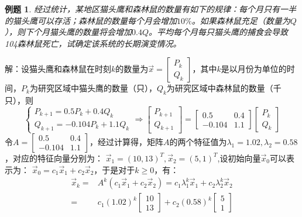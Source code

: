 \documentclass[a4paper]{book}
\newtheorem{eg}{例题}[chapter]
\begin{document}
\begin{eg}
经过统计，某地区猫头鹰和森林鼠的数量有如下的规律：每个月只有一半的猫头鹰可以存活；森林鼠的数量每个月会增加$10\%$。如果森林鼠充足（数量为$Q$），则下个月猫头鹰的数量将会增加$0.4Q$。平均每个月每只猫头鹰的捕食会导致104森林鼠死亡，试确定该系统的长期演变情况。
\end{eg}
解：设猫头鹰和森林鼠在时刻$k$的数量为$\vec{x}=\begin{bmatrix}P_k\\Q_k\end{bmatrix}$，其中$k$是以月份为单位的时间，$P_k$为研究区域中猫头鹰的数量（只），$Q_k$为研究区域中森林鼠的数量（千只），则
\begin{equation*}
\begin{cases}
P_{k+1}=0.5P_{k}+0.4Q_k\\
Q_{k+1}=-0.104P_k+1.1Q_k
\end{cases}
\Rightarrow
\begin{bmatrix}P_{k+1}\\Q_{k+1}\end{bmatrix}=
\begin{bmatrix}0.5&0.4\\-0.104&1.1\end{bmatrix}
\begin{bmatrix}P_k\\Q_k\end{bmatrix}
\end{equation*}
令$A=\begin{bmatrix}0.5&0.4\\-0.104&1.1\end{bmatrix}$，经过计算得，矩阵$A$的两个特征值为$\lambda_1=1.02,\lambda_2=0.58$，对应的特征向量分别为：
$\vec{x}_1=(10,13)^T,\vec{x}_2=(5,1)^T$,设初始向量$\vec{x}_0$可以表示为：
$\vec{x}_0=c_1\vec{x}_1+c_2\vec{x}_2$，于是对于$k\geq0$，有：
\begin{align*}
\vec{x}_k=&A^k(c_1\vec{x}_1+c_2\vec{x}_2)=c_1\lambda_1^k\vec{x}_1+c_2\lambda_2^k\vec{x}_2\\
=&c_1(1.02)^k\begin{bmatrix}10\\13\end{bmatrix}+c_2(0.58)^k\begin{bmatrix}5\\1\end{bmatrix}
\end{align*}

\end{document}
